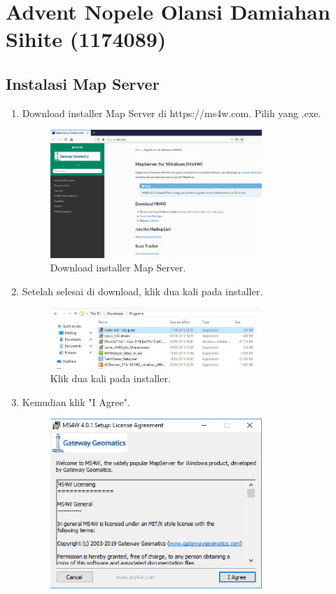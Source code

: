 \section{Advent Nopele Olansi Damiahan Sihite (1174089)}
\subsection{Instalasi Map Server}
\begin{enumerate}
	\item  Download installer Map Server di https://ms4w.com. Pilih yang .exe.
	\hfill\break
	\begin{figure}[H]
		\includegraphics[width=8cm]{figures/Tugas4/1174089/1.png}
		\centering
		\caption{Download installer Map Server.}
	\end{figure}
	\item  Setelah selesai di download, klik dua kali pada installer.
	\hfill\break
	\begin{figure}[H]
		\includegraphics[width=8cm]{figures/Tugas4/1174089/2.png}
		\centering
		\caption{Klik dua kali pada installer.}
	\end{figure}
	\item  Kemudian klik "I Agree".
	\hfill\break
	\begin{figure}[H]
		\includegraphics[width=8cm]{figures/Tugas4/1174089/3.png}

\end{figure}
\end{enumerate}
